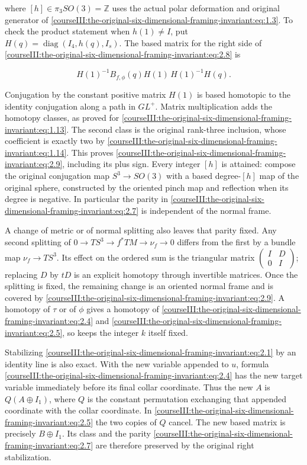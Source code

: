where \([h]\in\pi_3SO(3)=\mathbb Z\) uses the actual polar deformation and original generator of \eqref{courseIII:the-original-six-dimensional-framing-invariant:eq:1.3}. To check the product statement when \(h(1)\ne I\), put \(H(q)=\operatorname{diag}(I_4,h(q),I_s)\). The based matrix for the right side of \eqref{courseIII:the-original-six-dimensional-framing-invariant:eq:2.8} is

\[
 H(1)^{-1}B_{f,\phi}(q)H(1)\,
 H(1)^{-1}H(q).
\]

Conjugation by the constant positive matrix \(H(1)\) is based homotopic to the identity conjugation along a path in \(GL^+\). Matrix multiplication adds the homotopy classes, as proved for \eqref{courseIII:the-original-six-dimensional-framing-invariant:eq:1.13}. The second class is the original rank-three inclusion, whose coefficient is exactly two by \eqref{courseIII:the-original-six-dimensional-framing-invariant:eq:1.14}. This proves \eqref{courseIII:the-original-six-dimensional-framing-invariant:eq:2.9}, including its plus sign. Every integer \([h]\) is attained: compose the original conjugation map \(S^3\to SO(3)\) with a based degree-\([h]\) map of the original sphere, constructed by the oriented pinch map and reflection when its degree is negative. In particular the parity in \eqref{courseIII:the-original-six-dimensional-framing-invariant:eq:2.7} is independent of the normal frame.

A change of metric or of normal splitting also leaves that parity fixed. Any second splitting of
\(0\to TS^3\to f^*TM\to\nu_f\to0\)
differs from the first by a bundle map \(\nu_f\to TS^3\). Its effect on the ordered sum is the triangular matrix
\(\left(\begin{smallmatrix}I&D\\0&I\end{smallmatrix}\right)\);
replacing \(D\) by \(tD\) is an explicit homotopy through invertible matrices. Once the splitting is fixed, the remaining change is an oriented normal frame and is covered by \eqref{courseIII:the-original-six-dimensional-framing-invariant:eq:2.9}. A homotopy of \(\tau\) or of \(\phi\) gives a homotopy of \eqref{courseIII:the-original-six-dimensional-framing-invariant:eq:2.4} and \eqref{courseIII:the-original-six-dimensional-framing-invariant:eq:2.5}, so keeps the integer \(k\) itself fixed.

Stabilizing \eqref{courseIII:the-original-six-dimensional-framing-invariant:eq:2.1} by an identity line is also exact. With the new variable appended to \(u\), formula \eqref{courseIII:the-original-six-dimensional-framing-invariant:eq:2.4} has the new target variable immediately before its final collar coordinate. Thus the new \(A\) is \(Q(A\oplus I_1)\), where \(Q\) is the constant permutation exchanging that appended coordinate with the collar coordinate. In \eqref{courseIII:the-original-six-dimensional-framing-invariant:eq:2.5} the two copies of \(Q\) cancel. The new based matrix is precisely \(B\oplus I_1\). Its class and the parity \eqref{courseIII:the-original-six-dimensional-framing-invariant:eq:2.7} are therefore preserved by the original right stabilization.

